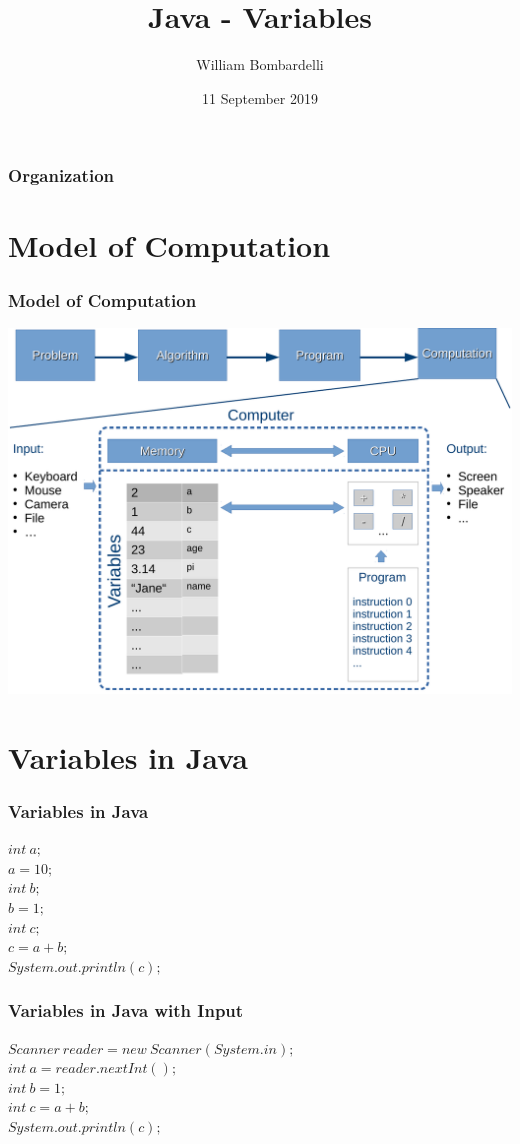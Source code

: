 \documentclass{beamer}
\title[Java]{Java - Variables}
\author[W. Bombardelli]{William Bombardelli}
\institute[Schweizerschule Mexiko]
{
	\vskip 12pt
	Schweizerschule Mexiko, Ciudad de México, Mexico \\
	\texttt{E-Mail...}
}
\date{11 September 2019}
\begin{document}
	\begin{frame}
		\titlepage
	\end{frame}
	
	\begin{frame}
		\frametitle{Organization}
		\tableofcontents
	\end{frame}
	
	\section{Model of Computation}
	\begin{frame}
		\frametitle{Model of Computation}
		\centering
		\vspace{-4px}
		\includegraphics[width=.9\textwidth]{Memory-CPU-Scheme}
	\end{frame}

	\section{Variables in Java}

	\begin{frame}
		\frametitle{Variables in Java}
		$int\ a;$\\
		$a = 10;$\\
		$int\ b;$\\
		$b = 1;$\\
		$int\ c;$\\
		$c = a + b;$\\
		$System.out.println(c);$
	\end{frame}

	\begin{frame}
		\frametitle{Variables in Java with Input}
		$Scanner\ reader = new\ Scanner(System.in);$\\
		$int\ a =reader.nextInt();$\\
		$int\ b = 1;$\\
		$int\ c = a + b;$\\
		$System.out.println(c);$
	\end{frame}
\end{document}
